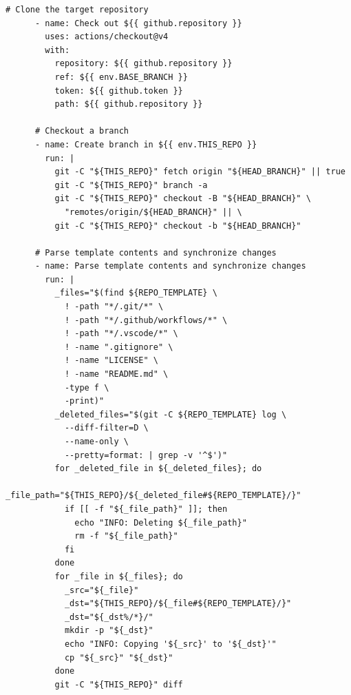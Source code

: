 \begin{center}
\begin{lstlisting}[caption={\texttt{dua-template} update GitHub workflow as of November 22, 2024 \cite{masocco_dua-template_nodate}.}, label={lst:duawf}]
      # Clone the target repository
      - name: Check out ${{ github.repository }}
        uses: actions/checkout@v4
        with:
          repository: ${{ github.repository }}
          ref: ${{ env.BASE_BRANCH }}
          token: ${{ github.token }}
          path: ${{ github.repository }}

      # Checkout a branch
      - name: Create branch in ${{ env.THIS_REPO }}
        run: |
          git -C "${THIS_REPO}" fetch origin "${HEAD_BRANCH}" || true
          git -C "${THIS_REPO}" branch -a
          git -C "${THIS_REPO}" checkout -B "${HEAD_BRANCH}" \
            "remotes/origin/${HEAD_BRANCH}" || \
          git -C "${THIS_REPO}" checkout -b "${HEAD_BRANCH}"

      # Parse template contents and synchronize changes
      - name: Parse template contents and synchronize changes
        run: |
          _files="$(find ${REPO_TEMPLATE} \
            ! -path "*/.git/*" \
            ! -path "*/.github/workflows/*" \
            ! -path "*/.vscode/*" \
            ! -name ".gitignore" \
            ! -name "LICENSE" \
            ! -name "README.md" \
            -type f \
            -print)"
          _deleted_files="$(git -C ${REPO_TEMPLATE} log \
            --diff-filter=D \
            --name-only \
            --pretty=format: | grep -v '^$')"
          for _deleted_file in ${_deleted_files}; do
            _file_path="${THIS_REPO}/${_deleted_file#${REPO_TEMPLATE}/}"
            if [[ -f "${_file_path}" ]]; then
              echo "INFO: Deleting ${_file_path}"
              rm -f "${_file_path}"
            fi
          done
          for _file in ${_files}; do
            _src="${_file}"
            _dst="${THIS_REPO}/${_file#${REPO_TEMPLATE}/}"
            _dst="${_dst%/*}/"
            mkdir -p "${_dst}"
            echo "INFO: Copying '${_src}' to '${_dst}'"
            cp "${_src}" "${_dst}"
          done
          git -C "${THIS_REPO}" diff


\end{lstlisting}
\end{center}

